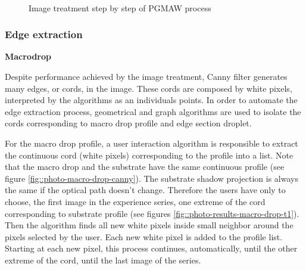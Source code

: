 \documentclass[12pt]{iopart}
\begin{document}
\begin{figure}[h!]
\begin{center}
\\
\end{center}
\caption{{\small Image treatment step by step of PGMAW process}}
\label{fig::photo-macro-drop}
\end{figure}


\subsubsection{Edge extraction}
\label{edge_extraction}
\textbf{Macrodrop}

Despite performance achieved by the image treatment, Canny filter
 generates many edges, or cords, in the image. These cords are composed
 by white pixels, interpreted by the algorithms as an individuals points.
 In order to automate the edge extraction process, geometrical and
 graph algorithms are used  to isolate the cords corresponding to
 macro drop profile and edge section droplet.

For the macro drop profile, a user interaction algorithm is responsible
 to extract the continuous cord (white pixels) corresponding
 to the profile into a list. Note  that the macro drop and 
the substrate have the same continuous profile (see figure \ref{fig::photo-macro-drop-canny}).
 The substrate shadow projection is always the same if the optical
 path doesn't change. Therefore the users have only to choose, the
 first image in the experience series, one extreme  of the cord 
corresponding to substrate profile (see figures \ref{fig::photo-results-macro-drop-t1}).
 Then the algorithm finds all new white pixels inside small neighbor around
 the pixels selected by the user. Each new white pixel  is added to the
 profile list. Starting at each new pixel, this process continues,
 automatically, until the other extreme of the cord, until the last
 image of the series.
 
\end{document}
